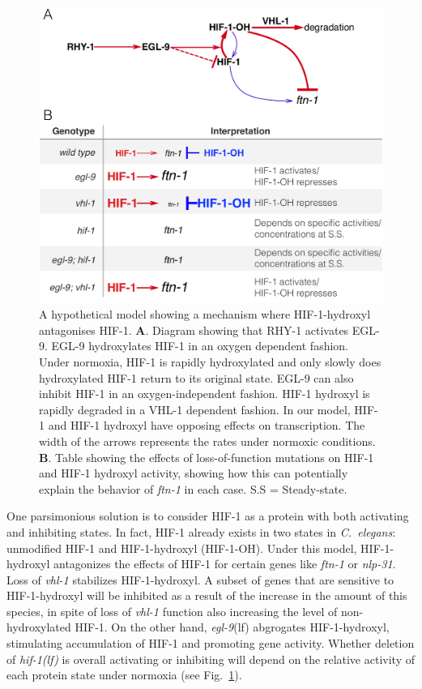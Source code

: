 \documentclass[9pt,twocolumn,twoside,lineno]{pnas-new}
\newcommand{\cel}{\emph{C.~elegans}}
\newcommand{\gene}[1]{\mbox{\emph{#1}}}
\newcommand{\nlp}{\gene{nlp-31}}
\newcommand{\ftna}{\gene{ftn-1}}
\newcommand{\egl}{\gene{egl-9}(lf)}
\newcommand{\hif}{\gene{hif-1(lf)}}
\newcommand{\hifp}{HIF-1}
\begin{document}
\begin{figure}[tbhp]
  \centering
  \includegraphics[width=.5\textwidth]{../figs/hif1oh_model.pdf}
  \caption{
    A hypothetical model showing a mechanism where \hifp{}-hydroxyl antagonises
    \hifp{}. \textbf{A}. Diagram showing that RHY-1 activates EGL-9. EGL-9
    hydroxylates HIF-1 in an oxygen dependent fashion. Under normoxia, HIF-1 is
    rapidly hydroxylated and only slowly does hydroxylated HIF-1 return to its
    original state. EGL-9 can also inhibit HIF-1 in an oxygen-independent
    fashion. HIF-1 hydroxyl is rapidly degraded in a VHL-1 dependent fashion. In
    our model, HIF-1 and HIF-1 hydroxyl have opposing effects on transcription.
    The width of the arrows represents the rates under normoxic conditions.
    \textbf{B}. Table showing the effects of loss-of-function mutations on HIF-1
    and HIF-1 hydroxyl activity, showing how this can potentially explain the
    behavior of \gene{ftn-1} in each case.  S.S = Steady-state.
  }
\label{fig:hif1oh_table}
\end{figure}

One parsimonious solution is to consider \hifp{} as a protein with both
activating and inhibiting states. In fact, \hifp{} already exists in two states
in \cel{}: unmodified \hifp{} and \hifp{}-hydroxyl (\hifp{}-OH). Under this
model, \hifp{}-hydroxyl antagonizes the effects of \hifp{} for certain genes
like \ftna{} or \nlp{}. Loss of \gene{vhl-1} stabilizes \hifp{}-hydroxyl. A
subset of genes that are sensitive to \hifp{}-hydroxyl will be inhibited as a
result of the increase in the amount of this species, in spite of loss of
\gene{vhl-1} function also increasing the level of non-hydroxylated \hifp{}. On
the other hand, \egl{} abgrogates \hifp{}-hydroxyl, stimulating accumulation of
\hifp{} and promoting gene activity. Whether deletion of \hif{} is overall
activating or inhibiting will depend on the relative activity of each protein
state under normoxia (see Fig.~\ref{fig:hif1oh_table}).
\end{document}
